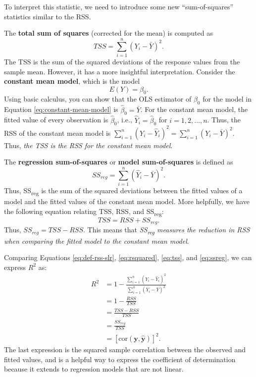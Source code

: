 \documentclass[
]{book}
\theoremstyle{definition}
\theoremstyle{definition}
\theoremstyle{definition}
\theoremstyle{definition}
\theoremstyle{remark}
\begin{document}
To interpret this statistic, we need to introduce some new ``sum-of-squares'' statistics similar to the RSS.

The \textbf{total sum of squares} (corrected for the mean) is computed as
\[
TSS = \sum_{i=1}^n(Y_i-\bar{Y})^2. \label{eq:tss}
\]
The TSS is the sum of the squared deviations of the response values from the sample mean. However, it has a more insightful interpretation. Consider the \textbf{constant mean model}, which is the model
\[
E(Y)=\beta_0. \label{eq:constant-mean-model}
\]
Using basic calculus, you can show that the OLS estimator of \(\beta_0\) for the model in Equation \eqref{eq:constant-mean-model} is \(\hat{\beta}_0=\bar{Y}\). For the constant mean model, the fitted value of every observation is \(\hat{\beta}_0\), i.e., \(\hat{Y}_i=\hat{\beta}_0\) for \(i=1,2,\ldots,n\). Thus, the RSS of the constant mean model is \(\sum_{i=1}^n(Y_i-\hat{Y}_i)^2=\sum_{i=1}^n(Y_i-\bar{Y})^2\). Thus, \emph{the TSS is the RSS for the constant mean model}.

The \textbf{regression sum-of-squares} or \textbf{model sum-of-squares} is defined as
\[
SS_{reg} = \sum_{i=1}^n(\hat{Y}_i-\bar{Y})^2. \label{eq:ssreg}
\]
Thus, SS\textsubscript{reg} is the sum of the squared deviations between the fitted values of a model and the fitted values of the constant mean model. More helpfully, we have the following equation relating TSS, RSS, and SS\textsubscript{reg}:
\[
TSS = RSS + SS_{reg}.\label{eq:ss-equality}
\]
Thus, \(SS_{reg}=TSS-RSS\). This means that \emph{SS\textsubscript{reg} measures the reduction in RSS when comparing the fitted model to the constant mean model}.

Comparing Equations \eqref{eq:def-rss-slr}, \eqref{eq:rsquared}, \eqref{eq:tss}, and \eqref{eq:ssreg}, we can express \(R^2\) as:
\[
\begin{aligned}
R^2 &= 1-\frac{\sum_{i=1}^n (Y_i-\hat{Y}_i)^2}{\sum_{i=1}^n (Y_i-\bar{Y})^2} \\
&= 1 - \frac{RSS}{TSS} \\
&= \frac{TSS - RSS}{TSS} \\
&= \frac{SS_{reg}}{TSS} \\
&= [\mathrm{cor}(\mathbf{y}, \hat{\mathbf{y}})]^2.
\end{aligned}
\label{eq:rsquared2}
\]
The last expression is the squared sample correlation between the observed and fitted values, and is a helpful way to express the coefficient of determination because it extends to regression models that are not linear.
\end{document}
